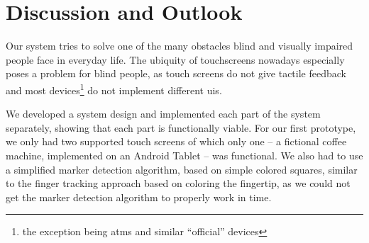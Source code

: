 \section{Discussion and Outlook}
Our system tries to solve one of the many obstacles blind and visually impaired people face in everyday life.
The ubiquity of touchscreens nowadays especially poses a problem for blind people, as touch screens do not give tactile feedback and most devices\footnote{the exception being \acp{atm} and similar \enquote{official} devices} do not implement different \acp{ui}.

We developed a system design and implemented each part of the system separately, showing that each part is functionally viable.
For our first prototype, we only had two supported touch screens of which only one -- a fictional coffee machine, implemented on an Android Tablet -- was functional.
We also had to use a simplified marker detection algorithm, based on simple colored squares, similar to the finger tracking approach based on coloring the fingertip, as we could not get the marker detection algorithm to properly work in time.


